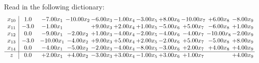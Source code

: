 \documentclass[9pt]{article}
\begin{document}
Read in the following dictionary:
\[\begin{array}{c| c c@{\hskip 2pt} c@{\hskip 2pt} c@{\hskip 2pt} c@{\hskip 2pt} c@{\hskip 2pt} c@{\hskip 2pt} c@{\hskip 2pt} c@{\hskip 2pt} c@{\hskip 2pt} }
 x_{10}   &  1.0 & -7.00 x_{1} & -10.00 x_{2} & -6.00 x_{3} & -1.00 x_{4} & -3.00 x_{5} & +  8.00 x_{6} & -10.00 x_{7} & +  6.00 x_{8} & -8.00 x_{9}\\
 x_{11}   &  -3.0 & -1.00 x_{1} &   & +  9.00 x_{3} & +  2.00 x_{4} & +  1.00 x_{5} & -5.00 x_{6} & +  5.00 x_{7} & -6.00 x_{8} & +  1.00 x_{9}\\
 x_{12}   &  0.0 & -9.00 x_{1} & -2.00 x_{2} & +  1.00 x_{3} & -4.00 x_{4} & -2.00 x_{5} & -4.00 x_{6} & -4.00 x_{7} & -10.00 x_{8} & -2.00 x_{9}\\
 x_{13}   &  -3.0 & -10.00 x_{1} & -4.00 x_{2} & +  9.00 x_{3} & +  5.00 x_{4} & +  2.00 x_{5} & -2.00 x_{6} & +  5.00 x_{7} & -5.00 x_{8} & +  8.00 x_{9}\\
 x_{14}   &  0.0 & -4.00 x_{1} & -5.00 x_{2} & -2.00 x_{3} & -4.00 x_{4} & -8.00 x_{5} & -3.00 x_{6} & +  2.00 x_{7} & +  4.00 x_{8} & +  4.00 x_{9}\\
\hline
z    &  0.0 & +  2.00 x_{1} & +  4.00 x_{2} & -3.00 x_{3} & +  3.00 x_{4} & -1.00 x_{5} & +  3.00 x_{6} & +  1.00 x_{7} &   & +  4.00 x_{9}\\
\end{array}\]
\end{document}
